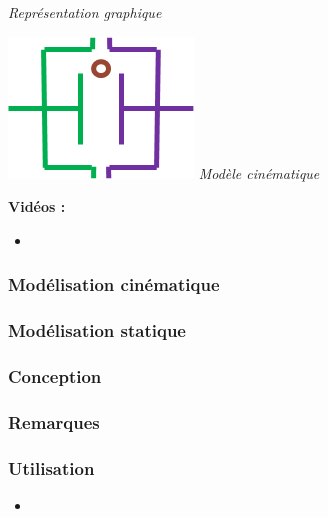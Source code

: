 \documentclass[11pt,oneside]{article}
\begin{document}
\begin{center}
\begin{minipage}[c]{.21\linewidth}
\begin{center}
\textit{Représentation graphique \cite{roue2}}
\end{center} 
\end{minipage}\hfill
\begin{minipage}[c]{.21\linewidth}
\begin{center}
\includegraphics[width=.9\textwidth]{png/roue_4}
\textit{Modèle cinématique}
\end{center} 
\end{minipage}\hfill
\end{center}


\textbf{Vidéos :}
\begin{itemize}
\item
\end{itemize}

\subsubsection{Modélisation cinématique}
\subsubsection{Modélisation statique}
\subsubsection{Conception}
\subsubsection{Remarques}
\subsubsection{Utilisation}
\begin{itemize}
\item
\end{itemize}
\newpage
\end{document}
